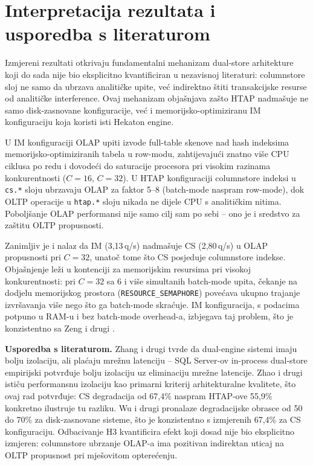 \section{Interpretacija rezultata i usporedba s literaturom}
\label{sec:interpretacija}

Izmjereni rezultati otkrivaju fundamentalni mehanizam dual-store arhitekture koji do sada nije bio eksplicitno kvantificiran u nezavisnoj literaturi: columnstore sloj ne samo da ubrzava analitičke upite, već indirektno štiti transakcijske resurse od analitičke interference. Ovaj mehanizam objašnjava zašto HTAP nadmašuje ne samo disk-zasnovane konfiguracije, već i memorijsko-optimiziranu IM konfiguraciju koja koristi isti Hekaton engine.

U IM konfiguraciji OLAP upiti izvode full-table skenove nad hash indeksima memorijsko-optimiziranih tabela u row-modu, zahtijevajući znatno više CPU ciklusa po redu i dovodeći do saturacije procesora pri visokim razinama konkurentnosti ($C=16$, $C=32$). U HTAP konfiguraciji columnstore indeksi u \texttt{cs.*} sloju ubrzavaju OLAP za faktor 5--8 (batch-mode naspram row-mode), dok OLTP operacije u \texttt{htap.*} sloju nikada ne dijele CPU s analitičkim nitima. Poboljšanje OLAP performansi nije samo cilj sam po sebi -- ono je i sredstvo za zaštitu OLTP propusnosti.

Zanimljiv je i nalaz da IM (3,13\,q/s) nadmašuje CS (2,80\,q/s) u OLAP propusnosti pri $C=32$, unatoč tome što CS posjeduje columnstore indekse. Objašnjenje leži u kontenciji za memorijskim resursima pri visokoj konkurentnosti: pri $C=32$ sa 6 i više simultanih batch-mode upita, čekanje na dodjelu memorijskog prostora (\texttt{RESOURCE\_SEMAPHORE}) povećava ukupno trajanje izvršavanja više nego što ga batch-mode skraćuje. IM konfiguracija, s podacima potpuno u RAM-u i bez batch-mode overhead-a, izbjegava taj problem, što je konzistentno sa Zeng i drugi \cite{zeng2023empirical}.

\textbf{Usporedba s literaturom.} Zhang i drugi \cite{zhang2024htap} tvrde da dual-engine sistemi imaju bolju izolaciju, ali plaćaju mrežnu latenciju -- SQL Server-ov in-process dual-store empirijski potvrđuje bolju izolaciju uz eliminaciju mrežne latencije. Zhao i drugi \cite{zhao2023benchmarking} ističu performansnu izolaciju kao primarni kriterij arhitekturalne kvalitete, što ovaj rad potvrđuje: CS degradacija od 67,4\% naspram HTAP-ove 55,9\% konkretno ilustruje tu razliku. Wu i drugi \cite{wu2025htap} pronalaze degradacijske obrasce od 50 do 70\% za disk-zasnovane sisteme, što je konzistentno s izmjerenih 67,4\% za CS konfiguraciju. Odbacivanje H3 kvantificira efekt koji dosad nije bio eksplicitno izmjeren: columnstore ubrzanje OLAP-a ima pozitivan indirektan uticaj na OLTP propusnost pri mješovitom opterećenju.

